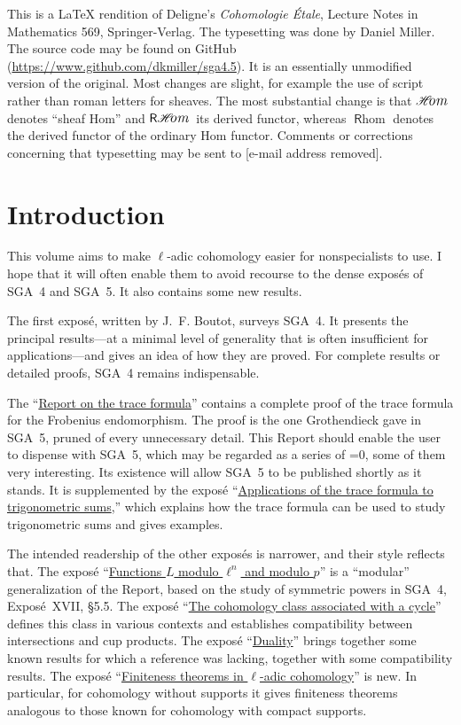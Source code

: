 \documentclass[oneside]{book}
\makeatletter
\providecommand\calligra{\itshape}}
\DeclareMathOperator{\Hom}{\mathscr{H}\text{\kern -3pt {\calligra\large om}}\,} %
\DeclareMathOperator{\rHom}{\mathsf{R}\vspace{-1pt}\mathscr{H}\text{\kern -3pt {\calligra\large om}}\,}
\DeclareMathOperator{\rhom}{\mathsf{R}\hom}
\theoremstyle{sga-source}
\theoremstyle{sga-source-dash}
\theoremstyle{sga-source-dotdash}
\theoremstyle{sga-source-number-note-dash}
\theoremstyle{sga-source-note-number-dotdash}
\theoremstyle{sga-source-example-dotdash}
\theoremstyle{sga-source-inline-number}
\theoremstyle{sga-source-bare-number}
\theoremstyle{sga-source}
\providecommand\EditionMode{1}
\providecommand\EditionLanguage{en}
\DeclareRobustCommand{\EditionVariantMark}[2]{%
  \ifx\relax#1\relax\else
    \ifmmode
      \hbox{\raisebox{0.7ex}{\normalfont\scriptsize\color{EditionAppColor}%
        \hyperlink{apparatus:#1}{\EditionShortOccurrence{#1}}}}%
    \else
      \textsuperscript{\normalfont\scriptsize\color{EditionAppColor}%
        \hyperlink{apparatus:#1}{\EditionShortOccurrence{#1}}}%
    \fi
  \fi}
\def\EditionShortOccurrence#1{\expandafter\EditionShortOccurrenceAux#1\@nil}
\def\EditionShortOccurrenceAux#1-#2\@nil{\number#2\relax}
\DeclareRobustCommand{\var}[4][]{%
  \ifnum\EditionMode=0\relax
    \expandafter\@firstoftwo
  \else
    \expandafter\@secondoftwo
  \fi
  {#2}{\ifnum\EditionMode=1\relax\EditionVariantMark{#1}{#4}\fi#3}}
\providecommand\CurrentPrintPage{}
\DeclareRobustCommand{\PrintPage}[1]{%
  \gdef\CurrentPrintPage{#1}%
  \hypertarget{printpage:\EditionLanguage:#1}{}%
  \marginnote{\normalfont\sffamily\scriptsize\color{black!65}%
    \ifnum\EditionMode=2\relax#1\else[p.~#1]\fi}}
\DeclareRobustCommand{\MathPage}[1]{\PrintPage{#1}}
\def\EditionPDFVar[#1]#2#3#4{\ifnum\EditionMode=0\relax\expandafter\@firstoftwo\else\expandafter\@secondoftwo\fi{#2}{#3}}
\let\var\EditionPDFVar
\def\PrintPage#1{}\def\MathPage#1{}%
\def\EditionVariantMark#1#2{}}
\makeatother
\begin{document}
This is a \LaTeX{} rendition of Deligne's \emph{Cohomologie \'Etale},
Lecture Notes in Mathematics 569, Springer-Verlag. The typesetting was done by
Daniel Miller. The source code may be found on GitHub
(\url{https://www.github.com/dkmiller/sga4.5}). It is an essentially
unmodified version of the original. Most changes are slight, for example the
use of script rather than roman letters for sheaves. The most substantial
change is that $\Hom$ denotes ``sheaf Hom'' and $\rHom$ its derived functor,
whereas $\rhom$ denotes the derived functor of the ordinary Hom functor.
Comments or corrections concerning that typesetting may be sent to
[e-mail address removed].


\clearpage\fi
\clearpage{}\hypersetup{pageanchor=true}


\chapter*{Introduction}\PrintPage{III}

This volume aims to make $\ell$-adic cohomology easier for nonspecialists to
use. I hope that it will often enable them to avoid recourse to the dense
expos\'es of SGA~4 and SGA~5. It also contains some new results.

The first expos\'e, written by J.~F. Boutot, surveys SGA~4. It presents the
principal results---at a minimal level of generality that is often
insufficient for applications---and gives an idea of how they are proved. For
complete results or detailed proofs, SGA~4 remains indispensable.

The ``\hyperref[II]{Report on the trace formula}'' contains a complete proof of the trace formula for the
Frobenius endomorphism. The proof is the one Grothendieck gave in SGA~5,
pruned of every unnecessary detail. This Report should enable the user to
dispense with SGA~5, which may be regarded as a series of \var[EN-0001]{digression}{digressions}{SGA45-CORR-0001}, some of
them very interesting. Its existence will allow SGA~5 to be published shortly
as it stands. It is supplemented by the expos\'e ``\hyperref[VI]{Applications of the trace formula to trigonometric sums},'' which
explains how the trace formula can be used to study trigonometric sums and
gives examples.

The intended readership of the other expos\'es is narrower, and their style
reflects that. The expos\'e ``\hyperref[III]{Functions $L$ modulo $\ell^n$ and modulo $p$}'' is a ``modular'' generalization
of the Report, based on the study of symmetric powers in SGA~4, Expos\'e~XVII,
\S5.5. The expos\'e ``\hyperref[IV]{The cohomology class associated with a cycle}'' defines this class in various contexts
and establishes compatibility between intersections and cup products. The
expos\'e ``\hyperref[V]{Duality}'' brings together some known results for which a
reference was lacking, together with some compatibility results. The expos\'e
``\hyperref[VII]{Finiteness theorems in $\ell$-adic cohomology}'' is new. In particular, for cohomology without supports it
gives finiteness theorems analogous to those known for cohomology with compact
supports.
\end{document}
